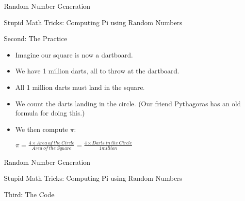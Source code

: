 \documentclass{beamer}
\begin{document}
\begin{frame}{Random Number Generation}

    Stupid Math Tricks: Computing Pi using Random Numbers

    Second: The Practice

    \begin{itemize}
        \item Imagine our square is now a dartboard.
	\item We have 1 million darts, all to throw at the dartboard.
	\item All 1 million darts must land in the square.
	\item We count the darts landing in the circle. (Our friend Pythagoras has an old formula for doing this.)
	\item We then compute $\pi$:

	\begin{math}
	\pi = \frac{4 \times Area\:of\:the\:Circle}{Area\:of\:the\:Square} = \frac{4 \times Darts\:in\:the\:Circle}{1 million}
	\end{math}

    \end{itemize}
\end{frame}

\begin{frame}{Random Number Generation}

    Stupid Math Tricks: Computing Pi using Random Numbers

    Third: The Code

\end{frame}
\end{document}
